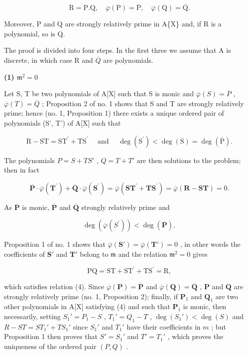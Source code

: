 \[
\mathrm{R} = \mathrm{P}. \mathrm{Q}, \quad \overline {{{\varphi}}} (\mathrm{P}) = \overline {{{\mathrm{P}}}}, \quad \overline {{{\varphi}}} (\mathrm{Q}) = \overline {{{\mathrm{Q}}}}.\tag{4}
\]

Moreover, P and Q are strongly relatively prime in A\{X\} and, if R is a polynomial, so is Q.

The proof is divided into four steps. In the first three we assume that A is discrete, in which case R and \(\overline{Q}\) are polynomials.

\textbf{(1) \(\mathfrak{m}^2 = 0\)}\par

Let S, T be two polynomials of A{[}X{]} such that S is monic and \(\overline{\varphi}(S) = \overline{P}\) , \(\overline{\varphi}(T) = \overline{Q}\) ; Proposition 2 of no. 1 shows that S and T are strongly relatively prime; hence (no. 1, Proposition 1) there exists a unique ordered pair of polynomials (S', T') of A{[}X{]} such that

\[
\mathrm{R} - \mathrm{ST} = \mathrm{ST} ^ {\prime} + \mathrm{TS} ^ {\prime} \quad \text { and } \quad \deg (\mathrm{S} ^ {\prime}) <   \deg (\mathrm{S}) = \deg (\overline {{\mathrm{P}}}).\tag{5}
\]

The polynomials \(P = S + TS'\) , \(Q = T + T'\) are then solutions to the problem; then in fact

\[
\overline {{{\mathbf {P}}}} \cdot \overline {{{\varphi}}} (\mathbf {T} ^ {\prime}) + \overline {{{\mathbf {Q}}}} \cdot \overline {{{\varphi}}} (\mathbf {S} ^ {\prime}) = \overline {{{\varphi}}} (\mathbf {S T} ^ {\prime} + \mathbf {T S} ^ {\prime}) = \overline {{{\varphi}}} (\mathbf {R} - \mathbf {S T}) = 0.\tag{6}
\]

As \(\overline{\mathbf{P}}\) is monic, \(\overline{\mathbf{P}}\) and \(\overline{\mathbf{Q}}\) strongly relatively prime and

\[
\deg (\overline {{{\varphi}}} (S ^ {\prime})) <   \deg (\overline {{{\mathbf {P}}}}),
\]

Proposition 1 of no. 1 shows that \(\bar{\varphi}(\mathbf{S}') = \bar{\varphi}(\mathbf{T}') = 0\) , in other words the coefficients of \(\mathbf{S}'\) and \(\mathbf{T}'\) belong to \(\mathfrak{m}\) and the relation \(\mathfrak{m}^2 = 0\) gives

\[
\mathrm{PQ} = \mathrm{ST} + \mathrm{ST} ^ {\prime} + \mathrm{TS} ^ {\prime} = \mathrm{R},
\]

which satisfies relation (4). Since \(\overline{\varphi}(\mathbf{P}) = \overline{\mathbf{P}}\) and \(\overline{\varphi}(\mathbf{Q}) = \overline{\mathbf{Q}}\) , \(\mathbf{P}\) and \(\mathbf{Q}\) are strongly relatively prime (no. 1, Proposition 2); finally, if \(\mathbf{P}_1\) and \(\mathbf{Q}_1\) are two other polynomials in A{[}X{]} satisfying (4) and such that \(\mathbf{P}_1\) is monic, then necessarily, setting \(S_1' = P_1 - S\) , \(T_1' = Q_1 - T\) , \(\deg(S_1') < \deg(S)\) and \(R - ST = ST_1' + TS_1'\) since \(S_1'\) and \(T_1'\) have their coefficients in \(m\) ; but Proposition 1 then proves that \(S' = S_1'\) and \(T' = T_1'\) , which proves the uniqueness of the ordered pair \((P, Q)\) .


